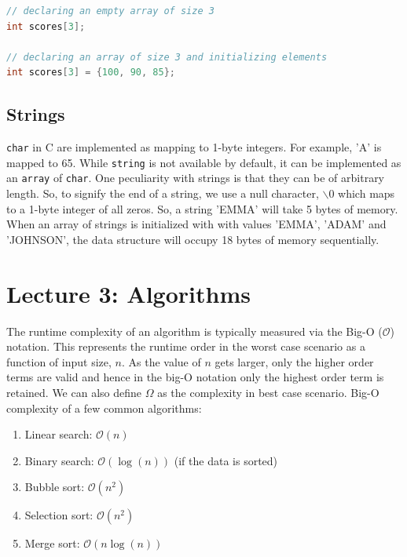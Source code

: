 \documentclass[11pt]{article}
\begin{document}
\begin{lstlisting}[language=C]
// declaring an empty array of size 3
int scores[3];

// declaring an array of size 3 and initializing elements
int scores[3] = {100, 90, 85};
\end{lstlisting}

\subsection*{Strings}
\texttt{char} in C are implemented as mapping to 1-byte integers. For example, 'A' is mapped to 65. While \texttt{string} is not available by default, it can be implemented as an \texttt{array} of \texttt{char}. One peculiarity with strings is that they can be of arbitrary length. So, to signify the end of a string, we use a null character, $\backslash0$ which maps to a 1-byte integer of all zeros. So, a string 'EMMA' will take 5 bytes of memory. When an array of strings is initialized with with values 'EMMA', 'ADAM' and 'JOHNSON', the data structure will occupy 18 bytes of memory sequentially. 

\section*{Lecture 3: Algorithms}
The runtime complexity of an algorithm is typically measured via the Big-O ($\mathcal{O}$) notation. This represents the runtime order in the worst case scenario as a function of input size, $n$. As the value of $n$ gets larger, only the higher order terms are valid and hence in the big-O notation only the highest order term is retained. We can also define $\Omega$ as the complexity in best case scenario. Big-O complexity of a few common algorithms: 
\begin{enumerate}
	\item Linear search: $\mathcal{O}(n)$
	\item Binary search: $\mathcal{O}\left(\log(n)\right)$ (if the data is sorted)
	\item Bubble sort: $\mathcal{O}(n^2)$
	\item Selection sort: $\mathcal{O}(n^2)$
	\item Merge sort: $\mathcal{O}\left(n\log(n)\right)$ 
\end{enumerate}
\end{document}
